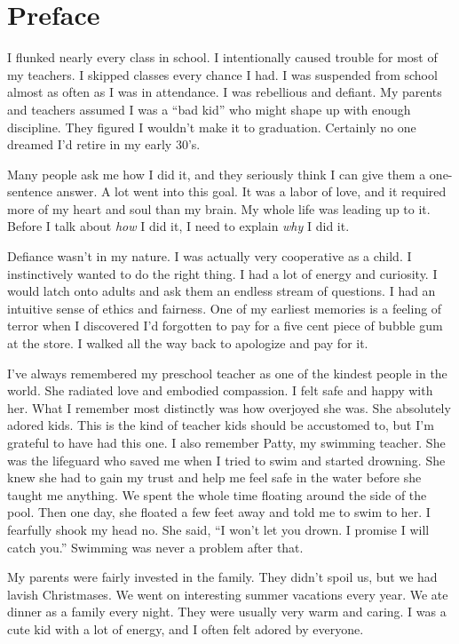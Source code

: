 \chapter{Preface}
I flunked nearly every class in school. I intentionally caused trouble for most of my teachers. I skipped classes every chance I had. I was suspended from school almost as often as I was in attendance. I was rebellious and defiant. My parents and teachers assumed I was a ``bad kid'' who might shape up with enough discipline. They figured I wouldn't make it to graduation. Certainly no one dreamed I'd retire in my early 30's.

Many people ask me how I did it, and they seriously think I can give them a one-sentence answer. A lot went into this goal. It was a labor of love, and it required more of my heart and soul than my brain. My whole life was leading up to it. Before I talk about \emph{how} I did it, I need to explain \emph{why} I did it.

Defiance wasn't in my nature. I was actually very cooperative as a child. I instinctively wanted to do the right thing. I had a lot of energy and curiosity. I would latch onto adults and ask them an endless stream of questions. I had an intuitive sense of ethics and fairness. One of my earliest memories is a feeling of terror when I discovered I'd forgotten to pay for a five cent piece of bubble gum at the store. I walked all the way back to apologize and pay for it.

I've always remembered my preschool teacher as one of the kindest people in the world. She radiated love and embodied compassion. I felt safe and happy with her. What I remember most distinctly was how overjoyed she was. She absolutely adored kids. This is the kind of teacher kids should be accustomed to, but I'm grateful to have had this one. I also remember Patty, my swimming teacher. She was the lifeguard who saved me when I tried to swim and started drowning. She knew she had to gain my trust and help me feel safe in the water before she taught me anything. We spent the whole time floating around the side of the pool. Then one day, she floated a few feet away and told me to swim to her. I fearfully shook my head no. She said, ``I won't let you drown. I promise I will catch you.'' Swimming was never a problem after that.

My parents were fairly invested in the family. They didn't spoil us, but we had lavish Christmases. We went on interesting summer vacations every year. We ate dinner as a family every night. They were usually very warm and caring. I was a cute kid with a lot of energy, and I often felt adored by everyone.

